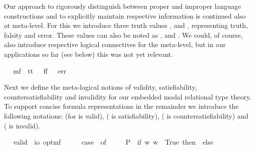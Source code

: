 \begin{isabellebody}
\begin{isamarkuptext}
Our approach to rigorously distinguish between proper and improper language constructions 
  and to explicitly maintain respective information is continued also at meta-level. For this 
  we introduce three truth values ,
   and , representing truth, falsity and error. These values can also 
  be noted as \isa{{\isasymtop}}, \isa{{\isasymbottom}} and \isa{{\isacharasterisk}}. We could, of course, also introduce  
  respective logical connectives for the meta-level, but in our applications so far (see below)
  this was not yet relevant.%
\end{isamarkuptext}%
\isamarkuptrue%
\ \isamarkupfalse%
\ mf\ {\isacharequal}\ tt\ {\isacharparenleft}{\isachardoublequoteopen}{\isasymtop}{\isachardoublequoteclose}{\isacharparenright}\ {\isacharbar}\ ff\ {\isacharparenleft}{\isachardoublequoteopen}{\isasymbottom}{\isachardoublequoteclose}{\isacharparenright}\ {\isacharbar}\ err\ {\isacharparenleft}{\isachardoublequoteopen}{\isacharasterisk}{\isachardoublequoteclose}{\isacharparenright}%
\begin{isamarkuptext}%
Next we define the meta-logical notions of validity, satisfiability, 
  countersatisfiability and invalidity for our embedded modal relational type theory. To support
  concise formula representations in the remainder we introduce the following notations: \isa{{\isacharbrackleft}{\isasymphi}{\isacharbrackright}} 
  (for \isa{{\isasymphi}} is valid),  (\isa{{\isasymphi}} is satisfiability),  
  (\isa{{\isasymphi}} is countersatisfiability) and  (\isa{{\isasymphi}} is invalid).%
\end{isamarkuptext}%
\isamarkuptrue%
\ \isamarkupfalse%
\ valid\ {\isacharcolon}{\isacharcolon}\ {\isachardoublequoteopen}io\ opt{\isasymRightarrow}mf{\isachardoublequoteclose}\ {\isacharparenleft}{\isachardoublequoteopen}{\isacharbrackleft}{\isacharunderscore}{\isacharbrackright}{\isachardoublequoteclose}\ {\isacharbrackleft}{}{\isacharbrackright}{\isacharparenright}\ \ {\isachardoublequoteopen}{\isacharbrackleft}{\isasymphi}{\isacharbrackright}\ {\isasymequiv}\ case\ {\isasymphi}\ of\ \isanewline
\ \ \ \ P{\isacharparenleft}{\isasympsi}{\isacharparenright}\ {\isasymRightarrow}\ if\ {\isasymforall}w{\isachardot}{\isacharparenleft}{\isasympsi}\ w{\isacharparenright}\ {\isasymlongleftrightarrow}\ True\ then\ {\isasymtop}\ else\ {\isasymbottom}\ \isanewline

\end{isabellebody}
